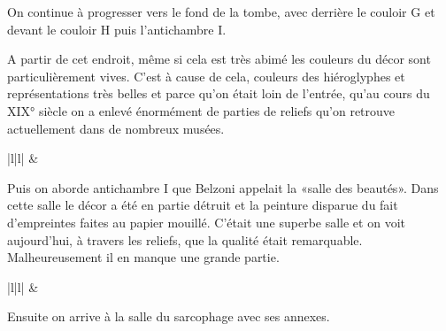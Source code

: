 \documentclass{article}
\title{}
\begin{document}
On continue à progresser vers le fond de la tombe, avec derrière le
couloir G et devant le couloir H puis l’antichambre I. 

A partir de cet endroit, même si cela est très abimé les couleurs du
décor sont particulièrement vives. C’est à cause de cela, couleurs des
hiéroglyphes et représentations très belles et parce qu’on était loin
de l’entrée, qu’au cours du XIX° siècle on a enlevé énormément de
parties de reliefs qu’on retrouve actuellement dans de nombreux musées.

\begin{flushleft}
\tablehead{}
\begin{supertabular}{|l|l|}
\hline
{} & \\\hline
\end{supertabular}
\end{flushleft}
Puis on aborde antichambre I que Belzoni appelait la «salle des
beautés». Dans cette salle le décor a été en partie détruit et la
peinture disparue du fait d’empreintes faites au papier mouillé.
C’était une superbe salle et on voit aujourd’hui, à travers les
reliefs, que la qualité était remarquable. Malheureusement il en manque
une grande partie.

\begin{flushleft}
\tablehead{}
\begin{supertabular}{|l|l|}
  & \\\hline
\end{supertabular}
\end{flushleft}
Ensuite on arrive à la salle du sarcophage avec ses annexes. 
\end{document}
